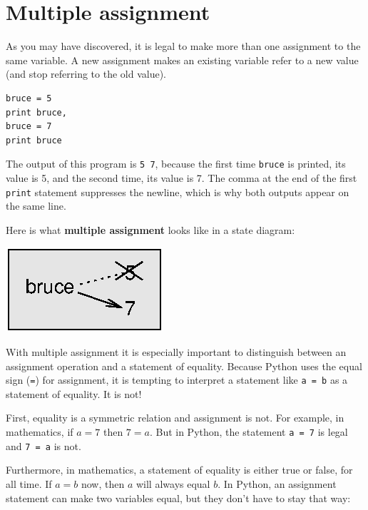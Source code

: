 \documentclass[10pt]{book}
\begin{document}
\section{Multiple assignment}


As you may have discovered, it is legal to
make more than one assignment to the same variable.  A
new assignment makes an existing variable refer to a new
value (and stop referring to the old value).

\beforeverb
\begin{verbatim}
bruce = 5
print bruce,
bruce = 7
print bruce
\end{verbatim}
\afterverb
%
The output of this program is {\tt 5 7}, because the first time
{\tt bruce} is printed, its value is 5, and the second time, its
value is 7.  The
comma at the end of the first {\tt print} statement suppresses
the newline, which is why both outputs
appear on the same line.


Here is what {\bf multiple assignment} looks like in a state diagram:


\beforefig
\centerline{\includegraphics{figs/assign2.eps}}
\afterfig

With multiple assignment it is especially important to distinguish
between an assignment operation and a statement of equality.  Because
Python uses the equal sign ({\tt =}) for assignment, it is tempting to
interpret a statement like {\tt a = b} as a statement of equality. It
is not!


First, equality is a symmetric relation and assignment is not.  For
example, in mathematics, if $a = 7$ then $7 = a$.  But in Python, the
statement {\tt a = 7} is legal and {\tt 7 = a} is not.

Furthermore, in mathematics, a statement of equality is either true or
false, for all time.  If $a = b$ now, then $a$ will always equal $b$.
In Python, an assignment statement can make two variables equal, but
they don't have to stay that way:
\end{document}
